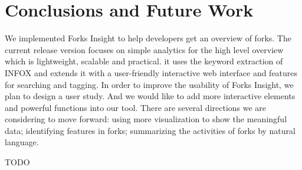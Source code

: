 \section{Conclusions and Future Work}
We implemented Forks Insight to help developers get an overview of forks. The current release version focuses on simple analytics for the high level overview which is lightweight, scalable and practical. it uses the keyword extraction of INFOX and extends it with a user-friendly interactive web interface and features for searching and tagging. In order to improve the usability of Forks Insight, we plan to design a user study. And we would like to add more interactive elements and powerful functions into our tool. There are several directions we are considering to move forward: using more visualization to show the meaningful data; identifying features in forks; summarizing the activities of forks by natural language.

\begin{acks}
  TODO
\end{acks}


